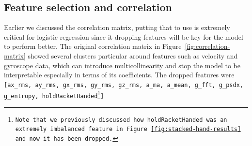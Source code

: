 \documentclass[10pt,twocolumn]{article}
\begin{document}
\subsection{Feature selection and correlation}
Earlier we discussed the correlation matrix, putting that to use is extremely critical for logistic regression since it dropping features will be key for the model to perform better.
The original correlation matrix in Figure~\ref{fig:correlation-matrix} showed several clusters particular around features such as velocity and gyroscope data, which can introduce multicollinearity and stop the model to be interpretable especially in terms of its coefficients. The dropped features were \texttt{[ax\_rms, ay\_rms, gx\_rms, gy\_rms, gz\_rms, a\_ma, a\_mean, g\_fft, g\_psdx, g\_entropy, holdRacketHanded\footnote{Note that we previously discussed how holdRacketHanded was an extremely imbalanced feature in Figure~\ref{fig:stacked-hand-results} and now it has been dropped.}]} 
\end{document}
